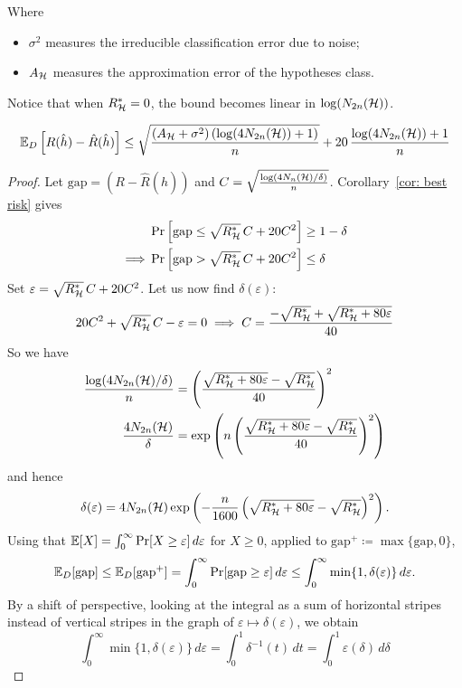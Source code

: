 \documentclass[reqno]{amsart}
\begin{document}
Where
\begin{itemize}
    \item $\sigma^2$ measures the irreducible classification error due to noise;
    \item $A_{\mathcal{H}}$ measures the approximation error of the hypotheses class. 
\end{itemize}

Notice that when $R^*_{\mathcal{H}} = 0$, the bound becomes linear in $\log(N_{2n}(\mathcal{H}))$.

\begin{corollary}
\[
\mathbb{E}_D\left[R(\hat h)-\hat R(\hat h)\right] \le \sqrt{\frac{(A_{\mathcal{H}} + \sigma^2)\left(\log(4N_{2n}(\mathcal{H})) + 1\right)}{n}} + 20\,\frac{\log(4N_{2n}(\mathcal{H})) + 1}{n}
\]
\begin{proof}
    Let $\text{gap} = (R-\hat R(\hat h))$ and $C = \sqrt{\frac{\log(4 N_n(\mathcal{H})/\delta)}{n}}$. Corollary~\ref{cor: best risk} gives
\begin{align*}
&\Pr\left[\text{gap} \le \sqrt{R^*_{\mathcal{H}}}\,C + 20C^2\right] \ge 1-\delta \\
\implies &\Pr\left[\text{gap} > \sqrt{R^*_{\mathcal{H}}}\,C + 20C^2\right] \le \delta
\end{align*}
Set $\varepsilon = \sqrt{R^*_{\mathcal{H}}}\,C + 20C^2$. Let us now find $\delta(\varepsilon)$:
\[
20C^2 + \sqrt{R^*_{\mathcal{H}}}\,C - \varepsilon = 0 \implies C = \frac{-\sqrt{R^*_{\mathcal{H}}} + \sqrt{R^*_{\mathcal{H}} + 80\varepsilon}}{40}
\]
So we have
\begin{align*}
\frac{\log(4N_{2n}(\mathcal{H})/\delta)}{n} &= \left(\frac{\sqrt{R^*_{\mathcal{H}} + 80\varepsilon} - \sqrt{R^*_{\mathcal{H}}}}{40}\right)^2 \\
\frac{4N_{2n}(\mathcal{H})}{\delta} &= \exp\left(n\left(\frac{\sqrt{R^*_{\mathcal{H}} + 80\varepsilon} - \sqrt{R^*_{\mathcal{H}}}}{40}\right)^2\right)
\end{align*}
and hence
\[
\delta(\varepsilon) = 4N_{2n}(\mathcal{H})\exp\left(-\frac{n}{1600}\left(\sqrt{R^*_{\mathcal{H}} + 80\varepsilon} - \sqrt{R^*_{\mathcal{H}}}\right)^2\right).
\]
Using that $\mathbb{E}[X] = \int_0^\infty \Pr[X \ge \varepsilon]\,d\varepsilon$ for $X \ge 0$, applied to $\text{gap}^+ \coloneq \max\{\text{gap}, 0\}$,
\[
\mathbb{E}_D[\text{gap}] \le \mathbb{E}_D[\text{gap}^+] = \int_0^\infty \Pr[\text{gap} \ge \varepsilon]\,d\varepsilon \le \int_0^\infty \min\{1, \delta(\varepsilon)\}\,d\varepsilon.
\]
By a shift of perspective, looking at the integral as a sum of horizontal stripes instead of vertical stripes in the graph of $\varepsilon \mapsto \delta(\varepsilon)$, we obtain
\[
\int_0^\infty \min\{1, \delta(\varepsilon)\}\,d\varepsilon = \int_0^1 \delta^{-1}(t)\,dt = \int_0^1 \varepsilon(\delta)\,d\delta
\]
\end{proof}
\end{corollary}
\end{document}
